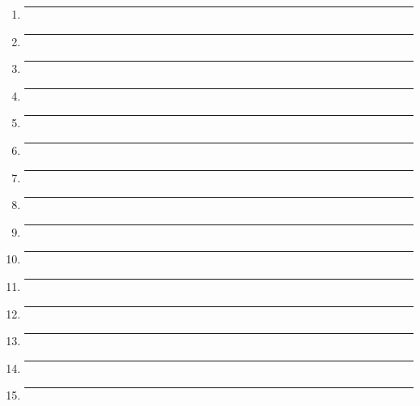 \documentclass[14pt]{extbook}
\newcommand{\litem}[1]{\item#1\hspace*{-1cm}\rule{\textwidth}{0.4pt}}
\begin{document}
\begin{enumerate}
{\begin{enumerate}[label=\Alph*.]
\end{enumerate} }
\litem{
\begin{enumerate}[label=\Alph*.]

\end{enumerate} }
\litem{
\begin{enumerate}[label=\Alph*.]

\end{enumerate} }
\litem{
\begin{enumerate}[label=\Alph*.]

\end{enumerate} }
\litem{
\begin{enumerate}[label=\Alph*.]

\end{enumerate} }
\litem{
\begin{enumerate}[label=\Alph*.]

\end{enumerate} }
\litem{
\begin{enumerate}[label=\Alph*.]

\end{enumerate} }
\litem{
\begin{enumerate}[label=\Alph*.]

\end{enumerate} }
\litem{
\begin{enumerate}[label=\Alph*.]

\end{enumerate} }
\litem{
\begin{enumerate}[label=\Alph*.]

\end{enumerate} }
\litem{
\begin{enumerate}[label=\Alph*.]

\end{enumerate} }
\litem{
\begin{enumerate}[label=\Alph*.]

\end{enumerate} }
\litem{
\begin{enumerate}[label=\Alph*.]

\end{enumerate} }
\litem{
\begin{enumerate}[label=\Alph*.]

\end{enumerate} }
\litem{
\begin{enumerate}[label=\Alph*.]

\end{enumerate} }
\litem{
\begin{enumerate}[label=\Alph*.]


\end{enumerate}}
\end{enumerate}
\end{document}
